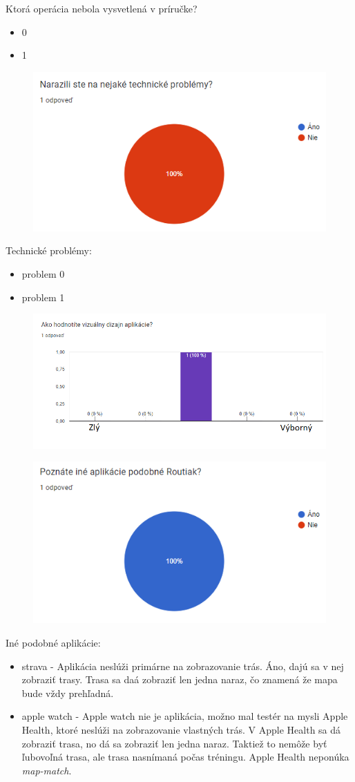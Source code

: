 \indent Ktorá operácia nebola vysvetlená v príručke?
\begin{itemize}
  \item 0
  \item 1
\end{itemize}
\begin{figure}[H]
  \centering
  \includegraphics[width=.7\textwidth]{img/dotaznik/6.png}
\end{figure}
\indent Technické problémy:
\begin{itemize}
  \item problem 0
  \item problem 1
\end{itemize}
\begin{figure}[H]
  \centering
  \includegraphics[width=.7\textwidth]{img/dotaznik/8.png}
\end{figure}
\begin{figure}[H]
  \centering
  \includegraphics[width=.7\textwidth]{img/dotaznik/9.png}
\end{figure}
\indent Iné podobné aplikácie:
\begin{itemize}
  \item strava - Aplikácia neslúži primárne na zobrazovanie trás. Áno, dajú sa v nej zobraziť trasy. Trasa sa daá zobraziť len jedna naraz, čo znamená že mapa bude vždy prehľadná.
  \item apple watch - Apple watch nie je aplikácia, možno mal testér na mysli Apple Health, ktoré neslúži na zobrazovanie vlastných trás. V Apple Health sa dá zobraziť trasa, no dá sa zobraziť len jedna naraz. Taktiež to nemôže byť ľubovoľná trasa, ale trasa nasnímaná počas tréningu. Apple Health neponúka \textit{map-match}.
\end{itemize}
